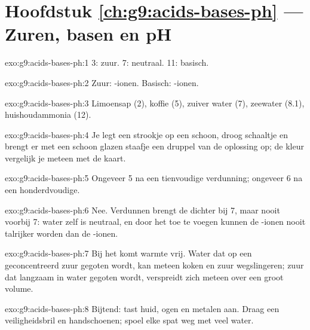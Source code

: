 \section*{Hoofdstuk \ref{ch:g9:acids-bases-ph} --- Zuren, basen en pH}

\begin{solution}{exo:g9:acids-bases-ph:1}
 3: zuur.  7: neutraal.  11: basisch.
\end{solution}

\begin{solution}{exo:g9:acids-bases-ph:2}
Zuur: -ionen. Basisch: -ionen.
\end{solution}

\begin{solution}{exo:g9:acids-bases-ph:3}
Limoensap (2), koffie (5), zuiver water (7), zeewater (8.1),
huishoudammonia (12).
\end{solution}

\begin{solution}{exo:g9:acids-bases-ph:4}
Je legt een strookje op een schoon, droog schaaltje en brengt er met een
schoon glazen staafje een druppel van de oplossing op; de kleur
vergelijk je meteen met de kaart.
\end{solution}

\begin{solution}{exo:g9:acids-bases-ph:5}
Ongeveer 5 na een tienvoudige verdunning; ongeveer 6 na een honderdvoudige.
\end{solution}

\begin{solution}{exo:g9:acids-bases-ph:6}
Nee. Verdunnen brengt de  dichter bij 7, maar nooit voorbij 7: water
zelf is neutraal, en door het toe te voegen kunnen de -ionen
nooit talrijker worden dan de -ionen.
\end{solution}

\begin{solution}{exo:g9:acids-bases-ph:7}
Bij het  komt warmte vrij. Water dat op een geconcentreerd zuur
gegoten wordt, kan meteen koken en zuur wegslingeren; zuur dat langzaam
in water gegoten wordt, verspreidt zich meteen over een groot volume.
\end{solution}

\begin{solution}{exo:g9:acids-bases-ph:8}
Bijtend: tast huid, ogen en metalen aan. Draag een veiligheidsbril en
handschoenen; spoel elke spat weg met veel water.
\end{solution}

